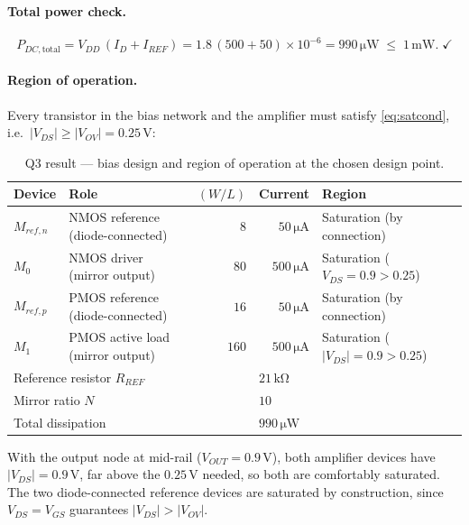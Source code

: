 \documentclass[12pt,a4paper]{article}
\newcommand{\U}[1]{\,\mathrm{#1}}
\begin{document}
\paragraph{Total power check.}
\[
P_{DC,\text{total}} = V_{DD}\,(I_D + I_{REF})
 = 1.8\,(500+50)\times10^{-6} = 990\U{\mu W} \;\leq\; 1\U{mW}.\;\checkmark
\]

\paragraph{Region of operation.}
Every transistor in the bias network and the amplifier must satisfy
\eqref{eq:satcond}, i.e.\ $|V_{DS}| \geq |V_{OV}| = 0.25\U{V}$:

\begin{table}[H]
\centering
\caption{Q3 result --- bias design and region of operation at the chosen
design point.}
\label{tab:q3}
\small
\begin{tabular}{llrrl}
\toprule
\textbf{Device} & \textbf{Role} & $(W/L)$ & \textbf{Current} & \textbf{Region} \\
\midrule
$M_{ref,n}$ & NMOS reference (diode-connected) & $8$   & $50\U{\mu A}$  & Saturation (by connection) \\
$M_0$       & NMOS driver (mirror output)      & $80$  & $500\U{\mu A}$ & Saturation ($V_{DS}=0.9 > 0.25$) \\
$M_{ref,p}$ & PMOS reference (diode-connected) & $16$  & $50\U{\mu A}$  & Saturation (by connection) \\
$M_1$       & PMOS active load (mirror output) & $160$ & $500\U{\mu A}$ & Saturation ($|V_{DS}|=0.9 > 0.25$) \\
\midrule
\multicolumn{3}{l}{Reference resistor $R_{REF}$} & \multicolumn{2}{l}{$21\U{k\Omega}$} \\
\multicolumn{3}{l}{Mirror ratio $N$} & \multicolumn{2}{l}{$10$} \\
\multicolumn{3}{l}{Total dissipation} & \multicolumn{2}{l}{$990\U{\mu W}$} \\
\bottomrule
\end{tabular}
\end{table}

With the output node at mid-rail ($V_{OUT}=0.9\U{V}$), both amplifier devices
have $|V_{DS}| = 0.9\U{V}$, far above the $0.25\U{V}$ needed, so both are
comfortably saturated. The two diode-connected reference devices are saturated
by construction, since $V_{DS}=V_{GS}$ guarantees $|V_{DS}| > |V_{OV}|$.

\end{document}
